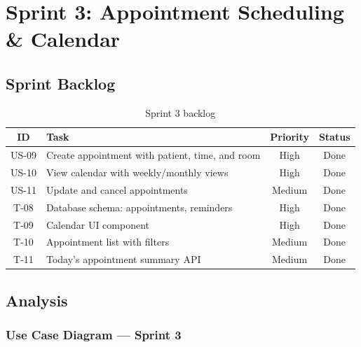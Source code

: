 \documentclass[12pt,a4paper,oneside]{report}
\begin{document}
\section{Sprint 3: Appointment Scheduling \& Calendar}

\subsection{Sprint Backlog}

\begin{table}[H]
\centering
\caption{Sprint 3 backlog}
\label{tab:sprint3_backlog}
\begin{tabular}{|c|p{7cm}|c|c|}
\hline
\textbf{ID} & \textbf{Task} & \textbf{Priority} & \textbf{Status} \\
\hline
US-09 & Create appointment with patient, time, and room & High & Done \\
\hline
US-10 & View calendar with weekly/monthly views & High & Done \\
\hline
US-11 & Update and cancel appointments & Medium & Done \\
\hline
T-08 & Database schema: appointments, reminders & High & Done \\
\hline
T-09 & Calendar UI component & High & Done \\
\hline
T-10 & Appointment list with filters & Medium & Done \\
\hline
T-11 & Today's appointment summary API & Medium & Done \\
\hline
\end{tabular}
\end{table}

\subsection{Analysis}

\subsubsection{Use Case Diagram — Sprint 3}
\end{document}
